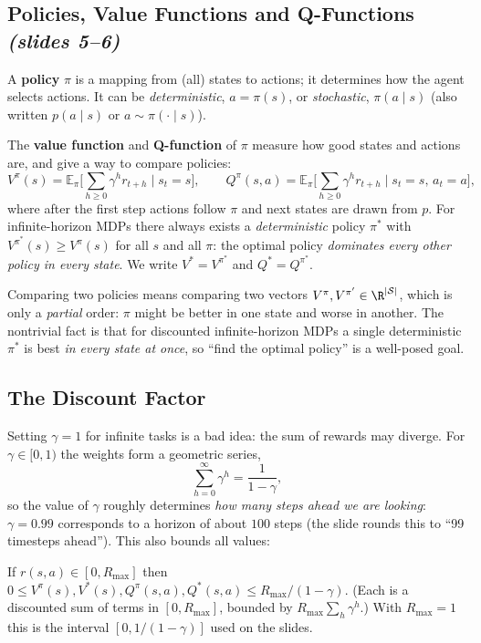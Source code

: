 \documentclass[11pt,a4paper]{article}
\newcommand{\E}{\mathbb{E}}
\newcommand{\slides}[1]{\emph{(slides #1)}}
\newcommand{\cS}{\mathcal{S}}
\theoremstyle{plain}
\theoremstyle{definition}
\theoremstyle{remark}
\begin{document}
\subsection{Policies, Value Functions and Q-Functions \slides{5--6}}
A \textbf{policy} $\pi$ is a mapping from (all) states to actions; it determines how the agent selects actions. It can be \emph{deterministic}, $a=\pi(s)$, or \emph{stochastic}, $\pi(a\mid s)$ (also written $p(a\mid s)$ or $a\sim\pi(\cdot\mid s)$).

The \textbf{value function} and \textbf{Q-function} of $\pi$ measure how good states and actions are, and give a way to compare policies:
\[
V^\pi(s)=\E_\pi\Big[\sum_{h\ge0}\gamma^h r_{t+h}\;\Big|\;s_t=s\Big],\qquad
Q^\pi(s,a)=\E_\pi\Big[\sum_{h\ge0}\gamma^h r_{t+h}\;\Big|\;s_t=s,\,a_t=a\Big],
\]
where after the first step actions follow $\pi$ and next states are drawn from $p$. For infinite-horizon MDPs there always exists a \emph{deterministic} policy $\pi^*$ with $V^{\pi^*}(s)\ge V^\pi(s)$ for all $s$ and all $\pi$: the optimal policy \emph{dominates every other policy in every state}. We write $V^*=V^{\pi^*}$ and $Q^*=Q^{\pi^*}$.

\begin{intuition}
Comparing two policies means comparing two vectors $V^\pi,V^{\pi'}\in\R^{|\cS|}$, which is only a \emph{partial} order: $\pi$ might be better in one state and worse in another. The nontrivial fact is that for discounted infinite-horizon MDPs a single deterministic $\pi^*$ is best \emph{in every state at once}, so ``find the optimal policy'' is a well-posed goal.
\end{intuition}

\subsection{The Discount Factor }
Setting $\gamma=1$ for infinite tasks is a bad idea: the sum of rewards may diverge. For $\gamma\in[0,1)$ the weights form a geometric series,
\[
\sum_{h=0}^{\infty}\gamma^h=\frac1{1-\gamma},
\]
so the value of $\gamma$ roughly determines \emph{how many steps ahead we are looking}: $\gamma=0.99$ corresponds to a horizon of about $100$ steps (the slide rounds this to ``99 timesteps ahead''). This also bounds all values:

\begin{fact}\label{fact:range}
If $r(s,a)\in[0,R_{\max}]$ then $0\le V^\pi(s),V^*(s),Q^\pi(s,a),Q^*(s,a)\le R_{\max}/(1-\gamma)$. (Each is a discounted sum of terms in $[0,R_{\max}]$, bounded by $R_{\max}\sum_h\gamma^h$.) With $R_{\max}=1$ this is the interval $[0,1/(1-\gamma)]$ used on the slides.
\end{fact}
\end{document}
